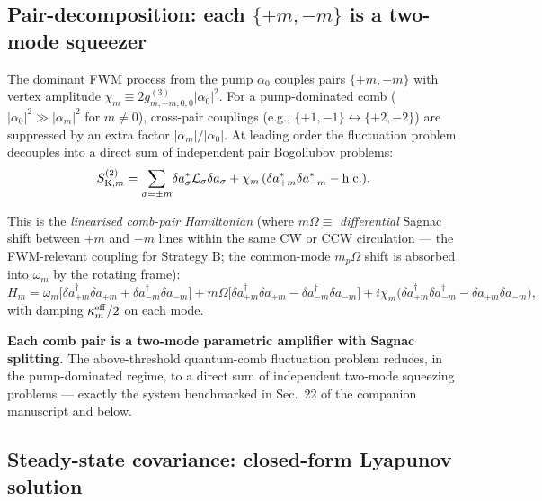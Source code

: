 \documentclass[11pt]{article}
\newcommand{\eff}{{\rm eff}}
\newcommand{\K}{{\rm K}}
\begin{document}
\subsection{Pair-decomposition: each $\{+m,-m\}$ is a two-mode squeezer}

The dominant FWM process from the pump $\alpha_0$ couples pairs
$\{+m,-m\}$ with vertex amplitude $\chi_m \equiv 2 g^{(3)}_{m,-m,0,0}|\alpha_0|^2$.
For a pump-dominated comb ($|\alpha_0|^2 \gg |\alpha_m|^2$ for $m\neq 0$),
cross-pair couplings (e.g., $\{+1,-1\}\leftrightarrow\{+2,-2\}$) are
suppressed by an extra factor $|\alpha_m|/|\alpha_0|$.  At leading
order the fluctuation problem decouples into a direct sum of
independent pair Bogoliubov problems:
\begin{equation}
  S^{(2)}_{\K,m} = \sum_{\sigma=\pm m}\!\delta a^*_\sigma
                    \mathcal{L}_\sigma \delta a_\sigma
                  + \chi_m\,(\delta a^*_{+m}\delta a^*_{-m} - \mathrm{h.c.}).
\end{equation}

This is the \emph{linearised comb-pair Hamiltonian} (where
$m\Omega\equiv$ \emph{differential} Sagnac shift between $+m$ and $-m$
lines within the same CW or CCW circulation --- the FWM-relevant
coupling for Strategy B; the common-mode $m_p\Omega$ shift is
absorbed into $\omega_m$ by the rotating frame):
\begin{equation}
  H_m = \omega_m\bigl[\delta a^\dagger_{+m}\delta a_{+m}
                        +\delta a^\dagger_{-m}\delta a_{-m}\bigr]
       + m\Omega\bigl[\delta a^\dagger_{+m}\delta a_{+m}
                                 -\delta a^\dagger_{-m}\delta a_{-m}\bigr]
       + i\chi_m\bigl(\delta a^\dagger_{+m}\delta a^\dagger_{-m}
                       -\delta a_{+m}\delta a_{-m}\bigr),
  \label{eq:pair_H}
\end{equation}
with damping $\kappa_m^\eff/2$ on each mode.

\begin{keyresult}
\textbf{Each comb pair is a two-mode parametric amplifier with Sagnac
splitting.}  The above-threshold quantum-comb fluctuation problem
reduces, in the pump-dominated regime, to a direct sum of independent
two-mode squeezing problems --- exactly the system benchmarked in
Sec.~22 of the companion manuscript and below.
\end{keyresult}

\subsection{Steady-state covariance: closed-form Lyapunov solution}
\label{sec:cov_solve}
\end{document}
